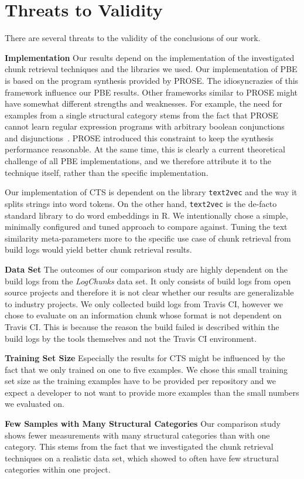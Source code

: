
\section{Threats to Validity}
There are several threats to the validity of the conclusions of our
work.

\noindent
\textbf{Implementation}
\label{sec:prose:impl}
Our results depend on the implementation of the investigated chunk
retrieval techniques and the libraries we used. Our implementation of
PBE is based on the program synthesis provided by PROSE\@. The
idiosyncrazies of this framework influence our PBE results. Other
frameworks similar to PROSE might have somewhat different strengths
and weaknesses. For example, the need for examples from a single
structural category stems from the fact that PROSE cannot learn
regular expression programs with arbitrary boolean conjunctions and
disjunctions~\cite{mayer2015user}. PROSE introduced this constraint to
keep the synthesis performance reasonable. At the same time, this is
clearly a current theoretical challenge of all PBE implementations,
and we therefore attribute it to the technique itself, rather than the
specific implementation.

Our implementation of CTS is dependent on the library {\tt text2vec}
and the way it splits strings into word tokens. On the other hand,
{\tt text2vec} is the de-facto standard library to do word embeddings
in R. We intentionally chose a simple, minimally configured and tuned
approach to compare against. Tuning the text similarity
meta-parameters more to the specific use case of chunk retrieval from
build logs would yield better chunk retrieval results.

\noindent
\textbf{Data Set}
The outcomes of our comparison study are highly dependent on the build
logs from the \emph{LogChunks} data set. It only consists of build
logs from open source projects and therefore it is not clear whether
our results are generalizable to industry projects. We only collected
build logs from Travis CI, however we chose to evaluate on an
information chunk whose format is not dependent on Travis CI\@. This
is because the reason the build failed is described within the build
logs by the tools themselves and not the Travis CI environment.

\noindent
\textbf{Training Set Size}
Especially the results for CTS might be influenced by the fact that we
only trained on one to five examples. We chose this small training set
size as the training examples have to be provided per repository and
we expect a developer to not want to provide more examples than the
small numbers we evaluated on.

\noindent
\textbf{Few Samples with Many Structural Categories}
Our comparison study shows fewer measurements with many structural
categories than with one category.
This stems from the fact that we investigated the chunk retrieval
techniques on a realistic data set, which showed to often have few
structural categories within one project.
